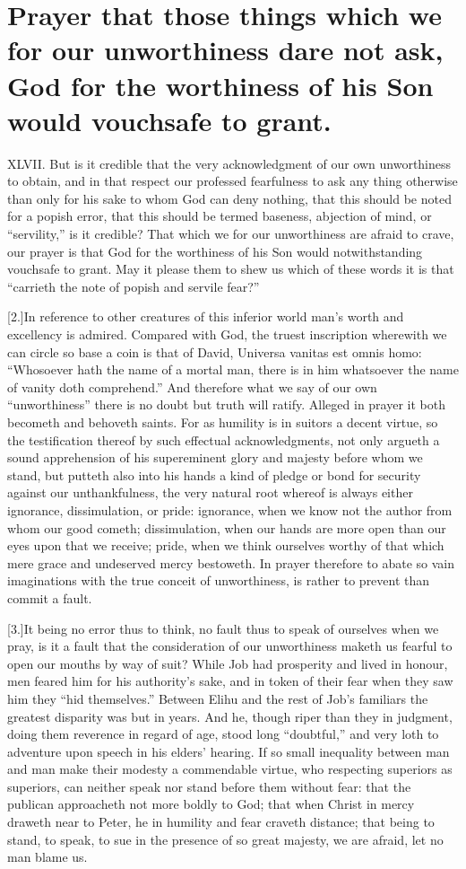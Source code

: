 \section*{Prayer that those things which we for our unworthiness dare not ask, God for the worthiness of his Son would vouchsafe to grant.}
XLVII. But is it credible that the very acknowledgment of our own unworthiness to obtain, and in that respect our professed fearfulness to ask any thing otherwise than only for his sake to whom God can deny nothing, that this should be noted for a popish error, that this should be termed baseness, abjection of mind, or “servility,” is it credible? That which we for our unworthiness are afraid to crave, our prayer is that God for the worthiness of his Son would notwithstanding vouchsafe to grant. May it please them to shew us which of these words it is that “carrieth the note of popish and servile fear?”

[2.]In reference to other creatures of this inferior world man’s worth and excellency is admired. Compared with God, the truest inscription wherewith we can circle so base a coin is that of David, Universa vanitas est omnis homo: “Whosoever  hath the name of a mortal man, there is in him whatsoever the name of vanity doth comprehend.”
 And therefore what we say of our own “unworthiness” there is no doubt but truth will ratify. Alleged in prayer it both becometh and behoveth saints. For as humility is in suitors a decent virtue, so the testification thereof by such effectual acknowledgments, not only argueth a sound apprehension of his supereminent glory and majesty before whom we stand, but putteth also into his hands a kind of pledge or bond for security against our unthankfulness, the very natural root whereof is always either ignorance, dissimulation, or pride: ignorance, when we know not the author from whom our good cometh; dissimulation, when our hands are more open than our eyes upon that we receive; pride, when we think ourselves worthy of that which mere grace and undeserved mercy bestoweth. In prayer therefore to abate so vain imaginations with the true conceit of unworthiness, is rather to prevent than commit a fault.

[3.]It being no error thus to think, no fault thus to speak of ourselves when we pray, is it a fault that the consideration of our unworthiness maketh us fearful to open our mouths by way of suit? While Job had prosperity and lived in honour, men feared him for his authority’s sake, and in token of their fear when they saw him they “hid themselves.” Between Elihu and the rest of Job’s familiars the greatest disparity was but in years. And he, though riper than they in judgment, doing them reverence in regard of age, stood long “doubtful,” and very loth to adventure upon speech in his elders’ hearing. If so small inequality between man and man make their modesty a commendable virtue, who respecting superiors as superiors, can neither speak nor stand before them without fear: that the publican approacheth not more boldly to God; that when Christ in mercy draweth near to Peter, he in humility and fear craveth distance; that being to stand, to speak, to sue in the presence of so great majesty, we are afraid, let no man blame us.




